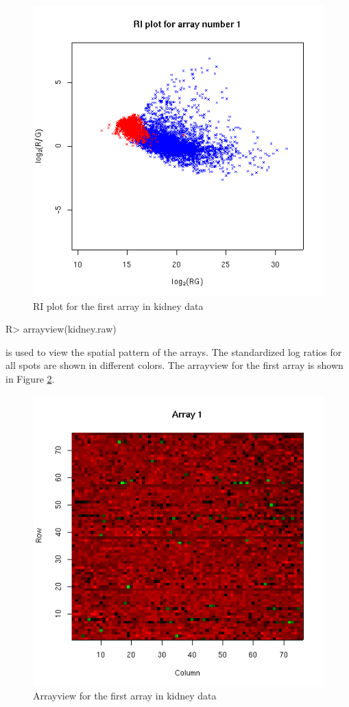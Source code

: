 \begin{enumerate}
\begin{figure}[htbp]
\includegraphics{riplot.png}
\caption{RI plot for the first array in kidney data}
\label{fig:riplot}
\end{figure}
\begin{Sinput}
R> arrayview(kidney.raw)
\end{Sinput}
 is used to view the spatial pattern of the arrays.
The standardized log ratios for all spots are shown in different colors.
The arrayview for the first array is shown in Figure \ref{fig:arrayview}.
\begin{figure}[htbp]
\centering
\includegraphics{arrayview.png}
\caption{Arrayview for the first array in kidney data}
\label{fig:arrayview}
\end{figure}


\end{enumerate}
